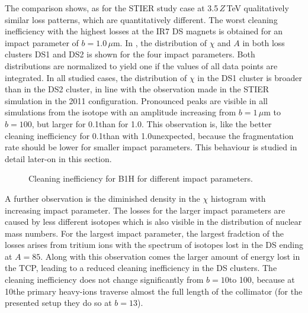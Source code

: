 The comparison shows, as for the STIER study case at 3.5\,$Z\,$TeV qualitatively similar loss patterns, which are quantitatively different. The worst cleaning inefficiency with the highest losses at the IR7 DS magnets is obtained for an impact parameter of $b=1.0\,\mu$m. In , the distribution of $\chi$ and $A$ in both loss clusters DS1 and DS2 is shown for the four impact parameters. Both distributions are normalized to yield one if the values of all data points are integrated. In all studied cases, the distribution of $\chi$ in the DS1 cluster is broader than in the DS2 cluster, in line with the observation made in the STIER simulation in the 2011 configuration. Pronounced peaks are visible in all simulations from the isotope  with an amplitude increasing from $b=1\,\mu$m to $b=100$\mum, but larger for 0.1\mum than for 1.0\mum. This observation is, like the better cleaning inefficiency for 0.1\mum than with 1.0\mum unexpected, because the fragmentation rate should be lower for smaller impact parameters. This behaviour is studied in detail later-on in this section. 



\begin{figure}[t]
  \centering
  \caption{Cleaning inefficiency for B1H for different impact parameters.}  
  \label{pic:16062203}
  \end{figure}


A further observation is the diminished density in the $\chi$ histogram with increasing impact parameter. The losses for the larger impact parameters are caused by less different isotopes which is also visible in the distribution of nuclear mass numbers.  For the largest impact parameter, the largest fradction of the losses arises from tritium ions with the spectrum of isotopes lost in the DS ending at $A=85$. Along with this observation comes the larger amount of energy lost in the TCP, leading to a reduced cleaning inefficiency in the DS clusters. The cleaning inefficiency does not change significantly from $b=10$\mum to 100\mum, because at 10\mum the primary heavy-ions traverse almost the full length of the collimator (for the presented setup they do so at $b=13$\mum). 

